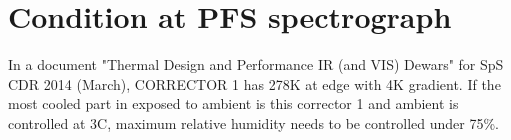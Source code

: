 \documentclass[a4paper,notitlepage]{article}
\begin{document}
\section{Condition at PFS spectrograph}

In a document "Thermal Design and Performance IR (and VIS) Dewars" for SpS CDR 
2014 (March), CORRECTOR 1 has 278K at edge with 4K gradient. 
If the most cooled part in exposed to ambient is this corrector 1 and 
ambient is controlled at 3C, maximum relative humidity needs to be controlled 
under 75\%. 
\end{document}
